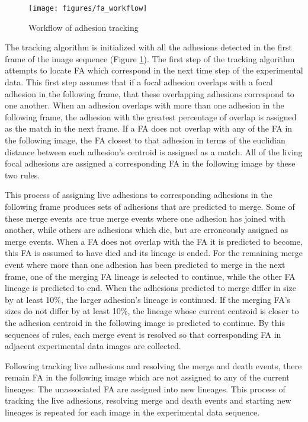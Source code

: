 \documentclass[letterpaper,twocolumn]{article}
\begin{document}
\begin{figure}[htbp]
\begin{center}
\texttt{[image: figures/fa\_workflow]}
\caption{Workflow of adhesion tracking}
\label{tracking_chart}
\end{center}
\end{figure}

The tracking algorithm is initialized with all the adhesions detected in the first frame of the image sequence (Figure \ref{tracking_chart}). The first step of the tracking algorithm attempts to locate FA which correspond in the next time step of the experimental data. This first step assumes that if a focal adhesion overlaps with a focal adhesion in the following frame, that these overlapping adhesions correspond to one another. When an adhesion overlaps with more than one adhesion in the following frame, the adhesion with the greatest percentage of overlap is assigned as the match in the next frame. If a FA does not overlap with any of the FA in the following image, the FA closest to that adhesion in terms of the euclidian distance between each adhesion's centroid is assigned as a match. All of the living focal adhesions are assigned a corresponding FA in the following image by these two rules.

This process of assigning live adhesions to corresponding adhesions in the following frame produces sets of adhesions that are predicted to merge. Some of these merge events are true merge events where one adhesion has joined with another, while others are adhesions which die, but are erroneously assigned as merge events. When a FA does not overlap with the FA it is predicted to become, this FA is assumed to have died and its lineage is ended. For the remaining merge event where more than one adhesion has been predicted to merge in the next frame, one of the merging FA lineage is selected to continue, while the other FA lineage is predicted to end. When the adhesions predicted to merge differ in size by at least 10\%, the larger adhesion's lineage is continued. If the merging FA's sizes do not differ by at least 10\%, the lineage whose current centroid is closer to the adhesion centroid in the following image is predicted to continue. By this sequences of rules, each merge event is resolved so that corresponding FA in adjacent experimental data images are collected.

Following tracking live adhesions and resolving the merge and death events, there remain FA in the following image which are not assigned to any of the current lineages. The unassociated FA are assigned into new lineages. This process of tracking the live adhesions, resolving merge and death events and starting new lineages is repeated for each image in the experimental data sequence. 
\end{document}
